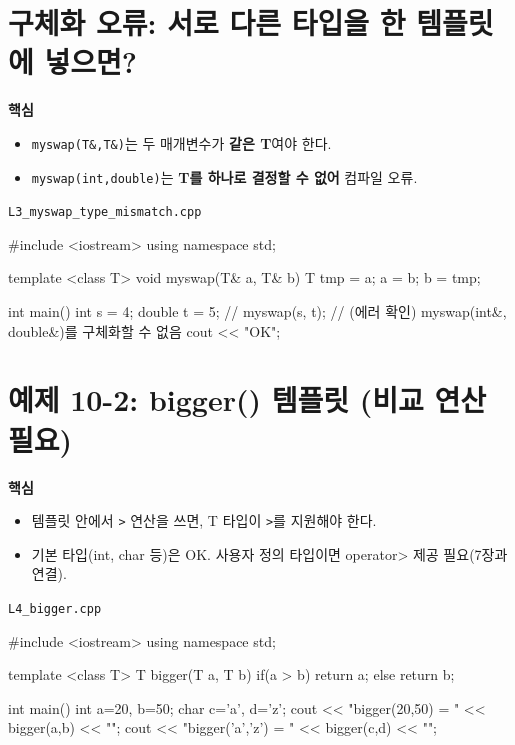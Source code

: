 \documentclass[11pt,a4paper]{article}
\newcommand{\filetag}[1]{\texttt{\color{Accent}#1}}
\begin{document}
\section{구체화 오류: 서로 다른 타입을 한 템플릿에 넣으면?}
\begin{GoalBox}
\textbf{핵심}
\begin{itemize}[leftmargin=18pt]
  \item \texttt{myswap(T\&,T\&)}는 두 매개변수가 \textbf{같은 T}여야 한다.
  \item \texttt{myswap(int,double)}는 \textbf{T를 하나로 결정할 수 없어} 컴파일 오류.
\end{itemize}
\end{GoalBox}

\noindent\filetag{L3\_myswap\_type\_mismatch.cpp}
\begin{cppcode}
#include <iostream>
using namespace std;

template <class T>
void myswap(T& a, T& b) {
    T tmp = a; a = b; b = tmp;
}

int main() {
    int s = 4;
    double t = 5;
    // myswap(s, t); // (에러 확인) myswap(int&, double&)를 구체화할 수 없음
    cout << "OK\n";
}
\end{cppcode}

\section{예제 10-2: bigger() 템플릿 (비교 연산 필요)}
\begin{GoalBox}
\textbf{핵심}
\begin{itemize}[leftmargin=18pt]
  \item 템플릿 안에서 \texttt{>} 연산을 쓰면, T 타입이 \texttt{>}를 지원해야 한다.
  \item 기본 타입(int, char 등)은 OK. 사용자 정의 타입이면 operator> 제공 필요(7장과 연결).
\end{itemize}
\end{GoalBox}

\noindent\filetag{L4\_bigger.cpp}
\begin{cppcode}
#include <iostream>
using namespace std;

template <class T>
T bigger(T a, T b) {
    if(a > b) return a;
    else return b;
}

int main() {
    int a=20, b=50;
    char c='a', d='z';
    cout << "bigger(20,50) = " << bigger(a,b) << "\n";
    cout << "bigger('a','z') = " << bigger(c,d) << "\n";
}
\end{cppcode}
\end{document}
